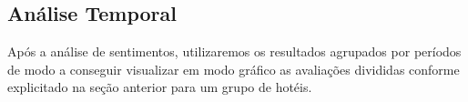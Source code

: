 


\subsection{Análise Temporal}
\label{subsec:analise_temporal}
Após a análise de sentimentos, utilizaremos os resultados agrupados por períodos de modo a conseguir visualizar em modo gráfico as avaliações divididas conforme explicitado na seção anterior para um grupo de hotéis.
